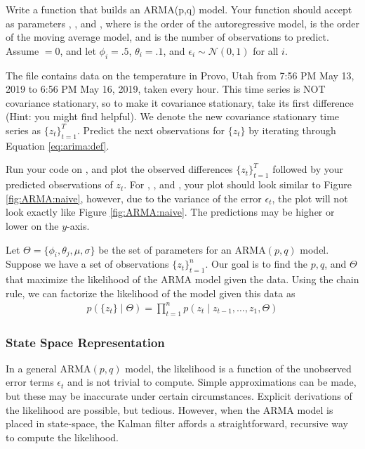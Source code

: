 \begin{problem}
Write a function  that builds an ARMA(p,q) model.
Your function should accept as parameters , , and , where  is the order of the autoregressive model,  is the order of the moving average model, and  is the number of observations to predict.
Assume $ = 0$, and let $\phi_i=.5$, $\theta_i=.1$, and $\epsilon_i\sim\mathscr{N}(0,1)$ for all $i$.

The file  contains data on the temperature in Provo, Utah from 7:56 PM May 13, 2019 to 6:56 PM May 16, 2019, taken every hour.
This time series is NOT covariance stationary, so to make it covariance stationary, take its first difference (Hint: you might find  helpful).
We denote the new covariance stationary time series as $\{z_t\}_{t=1}^T$.
Predict the next  observations for $\{z_t\}$ by iterating through Equation \ref{eq:arima:def}.

Run your code on , and plot the observed differences $\{z_t\}_{t=1}^T$ followed by your predicted observations of $z_t$.
For , , and , your plot should look similar to Figure \ref{fig:ARMA:naive}, however, due to the variance of the error $\epsilon_t$, the plot will not look exactly like Figure \ref{fig:ARMA:naive}.
The predictions may be higher or lower on the $y$-axis.
\label{prob:arma:naive}
\end{problem}

Let $\Theta = \{\phi_i, \theta_j, \mu, \sigma\}$ be the set of parameters
for an $\text{ARMA}(p,q)$ model.
Suppose we have a set of observations $\{z_t\}_{t=1}^n$.
Our goal is to find the $p, q$, and $\Theta$ that maximize the likelihood of the ARMA model given the data.
Using the chain rule, we can factorize the likelihood of the model given this data as
\begin{align}
    \label{eq:arma:factorized}
    p(\{z_t\} \mid \Theta) = \prod_{t=1}^{n} p(z_t \mid z_{t-1}, \ldots, z_{1},
    \Theta)
\end{align}

\subsubsection*{State Space Representation}

In a general $\text{ARMA}(p,q)$ model, the likelihood is a function of the
unobserved error terms $\epsilon_t$ and is not trivial to compute.
Simple approximations can be made, but these may be inaccurate under certain
circumstances.
Explicit derivations of the likelihood are possible, but
tedious.
However, when the $\text{ARMA}$ model is placed in state-space, the
Kalman filter affords a straightforward, recursive way to compute the
likelihood.

